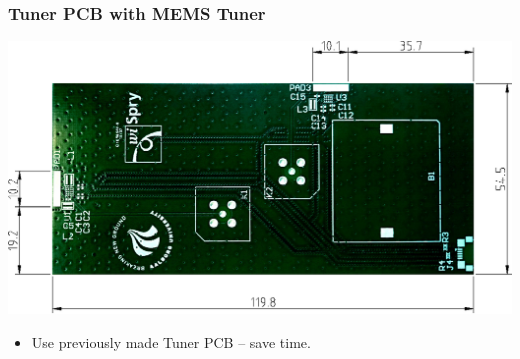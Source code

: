 \begin{frame}[fragile]
    \frametitle{Tuner PCB with MEMS Tuner}
\begin{center}
            \includegraphics[scale=0.5]{img/Lasse/samanthas_board.pdf}
\end{center}
\begin{itemize}
\item Use previously made Tuner PCB -- save time.
\end{itemize}
\end{frame}

